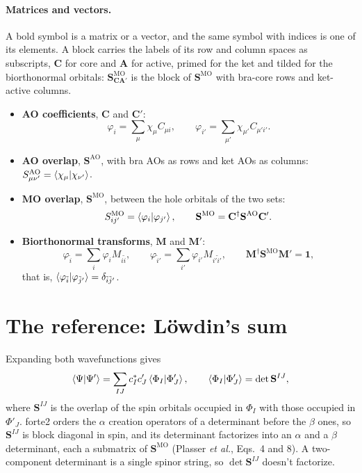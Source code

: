 \documentclass[aip,jcp,preprint]{revtex4-1}
\newcommand{\bvec}[1]{\mathbf{#1}}
\newcommand{\SAO}{\bvec{S}^{\mathrm{AO}}}
\newcommand{\SMO}{\bvec{S}^{\mathrm{MO}}}
\begin{document}
\paragraph{Matrices and vectors.}
A bold symbol is a matrix or a vector, and the same symbol with indices is one of its elements.
A block carries the labels of its row and column spaces as subscripts, $\bvec{C}$ for core and $\bvec{A}$ for active, primed for the ket and tilded for the biorthonormal orbitals: $\SMO_{\bvec{C}\bvec{A}'}$ is the block of $\SMO$ with bra-core rows and ket-active columns.
\begin{itemize}
\item \textbf{AO coefficients}, $\bvec{C}$ and $\bvec{C}'$:
 \begin{equation}
  \varphi_i = \sum_\mu \chi_\mu C_{\mu i},
  \qquad
  \varphi_{i'} = \sum_{\mu'} \chi_{\mu'} C_{\mu' i'}.
 \end{equation}
\item \textbf{AO overlap}, $\SAO$, with bra AOs as rows and ket AOs as columns: $S^{\mathrm{AO}}_{\mu\nu'} = \braket{\chi_\mu|\chi_{\nu'}}$.
\item \textbf{MO overlap}, $\SMO$, between the hole orbitals of the two sets:
 \begin{equation}
  S^{\mathrm{MO}}_{ij'} = \braket{\varphi_i|\varphi_{j'}},
  \qquad
  \SMO = \bvec{C}^\dagger \SAO \bvec{C}'.
  \label{eq:smo}
 \end{equation}
\item \textbf{Biorthonormal transforms}, $\bvec{M}$ and $\bvec{M}'$:
 \begin{equation}
  \varphi_{\tilde{i}} = \sum_i \varphi_i M_{i\tilde{i}},
  \qquad
  \varphi_{\tilde{i}'} = \sum_{i'} \varphi_{i'} M_{i'\tilde{i}'},
  \qquad
  \bvec{M}^\dagger \SMO \bvec{M}' = \bvec{1},
  \label{eq:biorthonormal}
 \end{equation}
 that is, $\braket{\varphi_{\tilde{i}}|\varphi_{\tilde{j}'}} = \delta_{\tilde{i}\tilde{j}'}$.
\end{itemize}

\section{The reference: L\"owdin's sum}
\label{sec:lowdin}

Expanding both wavefunctions gives
\begin{equation}
 \braket{\Psi|\Psi'} = \sum_{IJ} c_I^{*} c'_J \braket{\Phi_I|\Phi'_J},
 \qquad
 \braket{\Phi_I|\Phi'_J} = \det \bvec{S}^{IJ},
 \label{eq:lowdin}
\end{equation}
where $\bvec{S}^{IJ}$ is the overlap of the spin orbitals occupied in $\Phi_I$ with those occupied in $\Phi'_J$.\cite{Loewdin1955}
forte2 orders the $\alpha$ creation operators of a determinant before the $\beta$ ones, so $\bvec{S}^{IJ}$ is block diagonal in spin, and its determinant factorizes into an $\alpha$ and a $\beta$ determinant, each a submatrix of $\SMO$ (Plasser \emph{et al.}, Eqs.~4 and 8\cite{Plasser2016}).
A two-component determinant is a single spinor string, so $\det\bvec{S}^{IJ}$ doesn't factorize.
\end{document}
